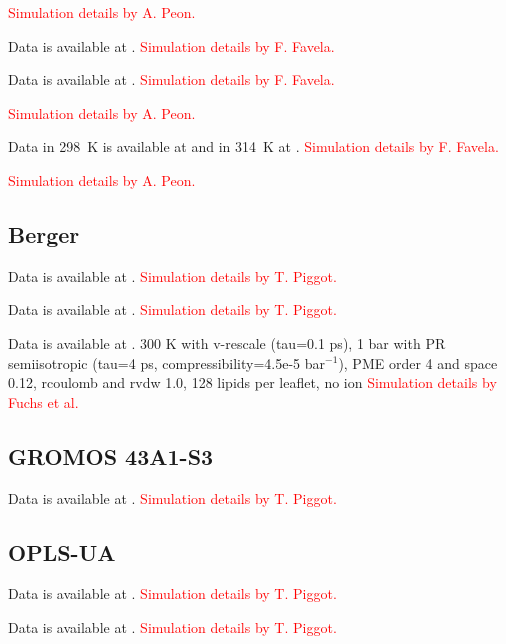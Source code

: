 \documentclass[journal=jpcbfk]{achemso}
\newcommand{\todo}[1]{\textcolor{red}{#1}}
\begin{document}
 \todo{Simulation details by A. Peon.}

 Data is available at \cite{slipidsDPPEfiles}. \todo{Simulation details by F. Favela.}

 Data is available at \cite{slipidsPOPGfiles}. \todo{Simulation details by F. Favela.}

 \todo{Simulation details by A. Peon.}

 Data in 298~K is available at \cite{slipidsDPPGfilesT298K} and in 314~K at \cite{slipidsDPPGfiles}.  \todo{Simulation details by F. Favela.}

 \todo{Simulation details by A. Peon.}

\subsection{Berger}

 Data is available at \cite{bergerPOPEfiles,berger2POPEfiles}. \todo{Simulation details by  T. Piggot.}

 Data is available at \cite{bergerDOPEfiles,berger2DOPEfiles}. \todo{Simulation details by  T. Piggot.}

 Data is available at \cite{POPCberger300K,POPC1POPE1berger}. 
300 K with v-rescale (tau=0.1 ps),
1 bar with PR semiisotropic (tau=4 ps, compressibility=4.5e-5 bar$^{-1}$),
PME order 4 and space 0.12,
rcoulomb and rvdw 1.0,
128 lipids per leaflet,
no ion \todo{Simulation details by Fuchs et al.}

\subsection{GROMOS 43A1-S3}

 Data is available at \cite{gromos43a1s3POPEfiles}. \todo{Simulation details by  T. Piggot.}

\subsection{OPLS-UA}

 Data is available at \cite{OPLSuaPOPEfiles}. \todo{Simulation details by  T. Piggot.}

 Data is available at \cite{OPLSuaWvdWPOPEfiles}. \todo{Simulation details by  T. Piggot.}
\end{document}
